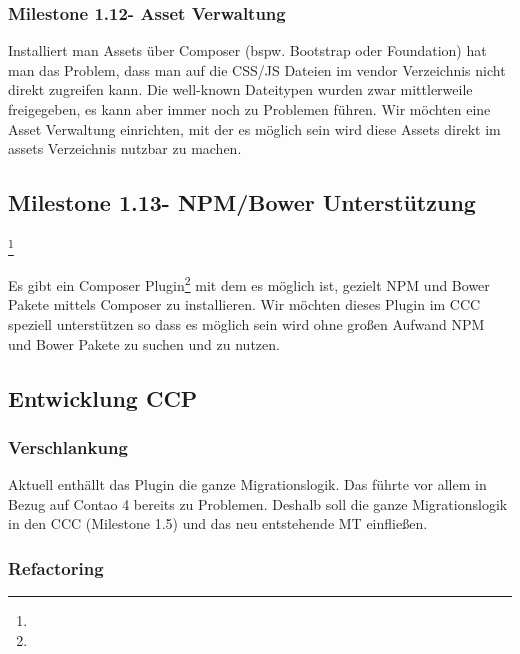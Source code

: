 \documentclass[
paper=a4,
draft=false,%
fontsize=10pt%
]{scrartcl}
\begin{document}
\subsubsection[Milestone 1.12 - Asset Verwaltung]{Milestone 1.12\footnotemark - Asset Verwaltung}

Installiert man Assets über Composer (bspw. Bootstrap oder Foundation) hat man das Problem, dass man auf die CSS/JS Dateien im vendor Verzeichnis nicht direkt zugreifen kann. Die well-known Dateitypen wurden zwar mittlerweile freigegeben, es kann aber immer noch zu Problemen führen. Wir möchten eine Asset Verwaltung einrichten, mit der es möglich sein wird diese Assets direkt im assets Verzeichnis nutzbar zu machen.

\subsection[Milestone 1.13 - NPM/Bower Unterstützung]{Milestone 1.13\footnotemark - NPM/Bower Unterstützung}
\footnote{}

Es gibt ein Composer Plugin\footnote{} mit dem es möglich ist, gezielt NPM und Bower Pakete mittels Composer zu installieren. Wir möchten dieses Plugin im CCC speziell unterstützen so dass es möglich sein wird ohne großen Aufwand NPM und Bower Pakete zu suchen und zu nutzen.

\subsection{Entwicklung CCP}

\subsubsection{Verschlankung}

Aktuell enthällt das Plugin die ganze Migrationslogik. Das führte vor allem in Bezug auf Contao 4 bereits zu Problemen. Deshalb soll die ganze Migrationslogik in den CCC (Milestone 1.5) und das neu entstehende MT einfließen.

\subsubsection{Refactoring}
\end{document}
